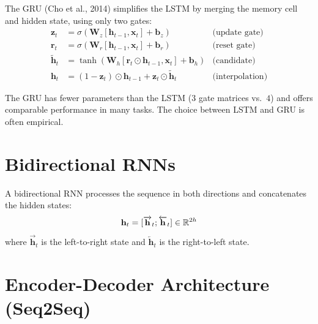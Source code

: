 \begin{definition}[GRU]
The GRU (Cho et al., 2014) simplifies the LSTM by merging the memory cell and
hidden state, using only two gates:
\begin{align}
\mathbf{z}_t &= \sigma(\mathbf{W}_z [\mathbf{h}_{t-1}, \mathbf{x}_t] + \mathbf{b}_z) & \text{(update gate)} \\
\mathbf{r}_t &= \sigma(\mathbf{W}_r [\mathbf{h}_{t-1}, \mathbf{x}_t] + \mathbf{b}_r) & \text{(reset gate)} \\
\tilde{\mathbf{h}}_t &= \tanh(\mathbf{W}_h [\mathbf{r}_t \odot \mathbf{h}_{t-1}, \mathbf{x}_t] + \mathbf{b}_h) & \text{(candidate)} \\
\mathbf{h}_t &= (1 - \mathbf{z}_t) \odot \mathbf{h}_{t-1} + \mathbf{z}_t \odot \tilde{\mathbf{h}}_t & \text{(interpolation)}
\end{align}
\end{definition}

\begin{remark}
The GRU has fewer parameters than the LSTM ($3$ gate matrices vs.\ $4$) and
offers comparable performance in many tasks. The choice between LSTM and GRU is
often empirical.
\end{remark}

\section{Bidirectional RNNs}
\label{sec:seq:bidirectional}

\begin{definition}[BiRNN]
A bidirectional RNN processes the sequence in both directions and concatenates
the hidden states:
\[
\mathbf{h}_t = [\overrightarrow{\mathbf{h}}_t ; \overleftarrow{\mathbf{h}}_t] \in \mathbb{R}^{2h}
\]
where $\overrightarrow{\mathbf{h}}_t$ is the left-to-right state and
$\overleftarrow{\mathbf{h}}_t$ is the right-to-left state.
\end{definition}

\section{Encoder-Decoder Architecture (Seq2Seq)}
\label{sec:seq:seq2seq}

